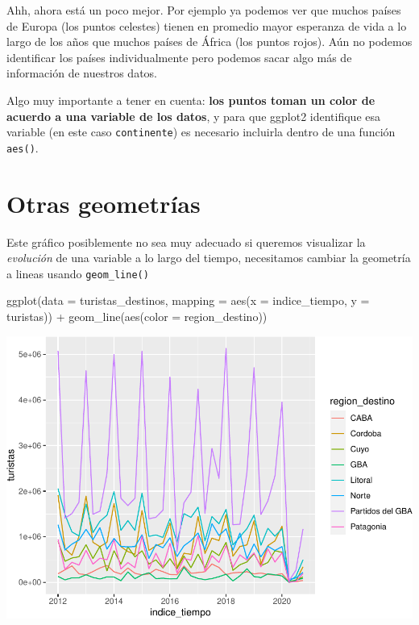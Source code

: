 \documentclass[
  openany]{book}
\newenvironment{Shaded}{\begin{snugshade}}{\end{snugshade}}
\newcommand{\AttributeTok}[1]{\textcolor[rgb]{0.77,0.63,0.00}{#1}}
\newcommand{\FunctionTok}[1]{\textcolor[rgb]{0.00,0.00,0.00}{#1}}
\newcommand{\NormalTok}[1]{#1}
\newcommand{\SpecialCharTok}[1]{\textcolor[rgb]{0.00,0.00,0.00}{#1}}
\begin{document}
Ahh, ahora está un poco mejor.
Por ejemplo ya podemos ver que muchos países de Europa (los puntos celestes) tienen en promedio mayor esperanza de vida a lo largo de los años que muchos países de África (los puntos rojos).
Aún no podemos identificar los países individualmente pero podemos sacar algo más de información de nuestros datos.

Algo muy importante a tener en cuenta: \textbf{los puntos toman un color de acuerdo a una variable de los datos}, y para que ggplot2 identifique esa variable (en este caso \texttt{continente}) es necesario incluirla dentro de una función \texttt{aes()}.

\hypertarget{otras-geometruxedas}{%
\section{Otras geometrías}\label{otras-geometruxedas}}

Este gráfico posiblemente no sea muy adecuado si queremos visualizar la \emph{evolución} de una variable a lo largo del tiempo, necesitamos cambiar la geometría a lineas usando \texttt{geom\_line()}

\begin{Shaded}
\begin{Highlighting}[]
\FunctionTok{ggplot}\NormalTok{(}\AttributeTok{data =}\NormalTok{ turistas\_destinos, }\AttributeTok{mapping =} \FunctionTok{aes}\NormalTok{(}\AttributeTok{x =}\NormalTok{ indice\_tiempo, }\AttributeTok{y =}\NormalTok{ turistas)) }\SpecialCharTok{+}
  \FunctionTok{geom\_line}\NormalTok{(}\FunctionTok{aes}\NormalTok{(}\AttributeTok{color =}\NormalTok{ region\_destino))}
\end{Highlighting}
\end{Shaded}

\begin{center}\includegraphics[width=1\linewidth]{DT6_files/figure-latex/unnamed-chunk-51-1} \end{center}
\end{document}
